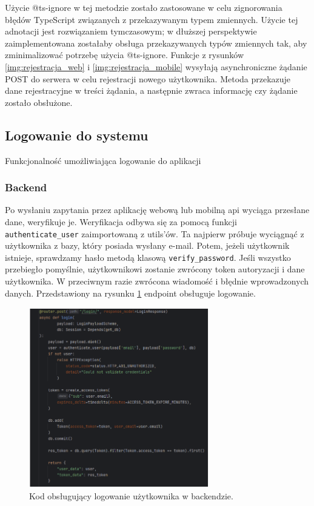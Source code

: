 Użycie @ts-ignore w tej metodzie zostało zastosowane w celu zignorowania błędów TypeScript związanych z przekazywanym typem zmiennych. Użycie tej adnotacji jest rozwiązaniem tymczasowym; w dłuższej perspektywie zaimplementowana zostałaby obsługa przekazywanych typów zmiennych tak, aby zminimalizować potrzebę użycia @ts-ignore.
\indent Funkcje z rysunków \ref{img:rejestracja_web} i \ref{img:rejestracja_mobile} wysyłają asynchroniczne żądanie POST do serwera w celu rejestracji nowego użytkownika. Metoda przekazuje dane rejestracyjne w treści żądania, a następnie zwraca informację czy żądanie zostało obsłużone.

\subsection{Logowanie do systemu}
Funkcjonalność umożliwiająca logowanie do aplikacji

\subsubsection{Backend}
Po wysłaniu zapytania przez aplikację webową lub mobilną api wyciąga przesłane dane, weryfikuje je.
Weryfikacja odbywa się za pomocą funkcji \texttt{authenticate\_user} zaimportowaną z utils’ów.
Ta najpierw próbuje wyciągnąć z użytkownika z bazy, który posiada wysłany e-mail. Potem, jeżeli użytkownik istnieje, sprawdzamy hasło metodą klasową \texttt{verify\_password}. Jeśli wszystko przebiegło pomyślnie, użytkownikowi zostanie zwrócony token autoryzacji i dane użytkownika. W przeciwnym razie zwrócona wiadomość i błędnie wprowadzonych danych. Przedstawiony na rysunku \ref{img:logowanie_backend} endpoint obsługuje logowanie.

\begin{figure}[H]
    \centering
    \includegraphics[width=0.7\textwidth]{chapters/chapter_8/screens/logowanie_backend}
    \caption{Kod obsługujący logowanie użytkownika w backendzie.}
    \label{img:logowanie_backend}
\end{figure}

